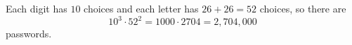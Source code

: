 Each digit has $10$ choices and each letter has $26+26=52$ choices, so there are
\[10^3\cdot52^2=1000\cdot2704=\boxed{2{,}704{,}000}\]
passwords.
